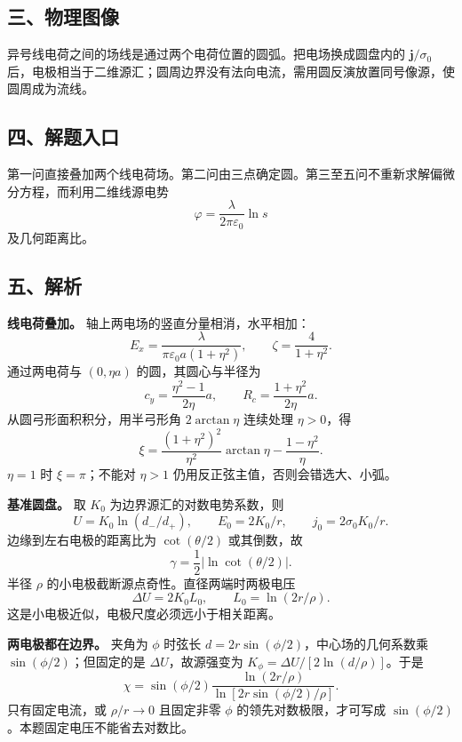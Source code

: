 \documentclass[12pt,a4paper,UTF8]{ctexart}
\begin{document}
\subsection{三、物理图像}\label{ux4e09ux7269ux7406ux56feux50cf-2}

异号线电荷之间的场线是通过两个电荷位置的圆弧。把电场换成圆盘内的
\(\boldsymbol j/\sigma_0\)
后，电极相当于二维源汇；圆周边界没有法向电流，需用圆反演放置同号像源，使圆周成为流线。

\subsection{四、解题入口}\label{ux56dbux89e3ux9898ux5165ux53e3-2}

第一问直接叠加两个线电荷场。第二问由三点确定圆。第三至五问不重新求解偏微分方程，而利用二维线源电势
\[
\varphi=\frac{\lambda}{2\pi\varepsilon_0}\ln s
\] 及几何距离比。

\subsection{五、解析}\label{ux4e94ux89e3ux6790-2}

\textbf{线电荷叠加。} 轴上两电场的竖直分量相消，水平相加： \[
E_x=\frac{\lambda}{\pi\varepsilon_0a(1+\eta^2)},
\qquad \boxed{\zeta=\frac4{1+\eta^2}}.
\] 通过两电荷与 \((0,\eta a)\) 的圆，其圆心与半径为 \[
c_y=\frac{\eta^2-1}{2\eta}a,\qquad
R_c=\frac{1+\eta^2}{2\eta}a.
\] 从圆弓形面积积分，用半弓形角 \(2\arctan\eta\) 连续处理 \(\eta>0\)，得
\[
\boxed{\xi=\frac{(1+\eta^2)^2}{\eta^2}\arctan\eta
-\frac{1-\eta^2}{\eta}}.
\] \(\eta=1\) 时 \(\xi=\pi\)；不能对 \(\eta>1\)
仍用反正弦主值，否则会错选大、小弧。

\textbf{基准圆盘。} 取 \(K_0\) 为边界源汇的对数电势系数，则 \[
U=K_0\ln(d_-/d_+),\qquad
E_0=2K_0/r,\qquad j_0=2\sigma_0K_0/r.
\] 边缘到左右电极的距离比为 \(\cot(\theta/2)\) 或其倒数，故 \[
\boxed{\gamma=\frac12|\ln\cot(\theta/2)|}.
\] 半径 \(\rho\) 的小电极截断源点奇性。直径两端时两极电压 \[
\Delta U=2K_0 L_0,\qquad L_0=\ln(2r/\rho).
\] 这是小电极近似，电极尺度必须远小于相关距离。

\textbf{两电极都在边界。} 夹角为 \(\phi\) 时弦长
\(d=2r\sin(\phi/2)\)，中心场的几何系数乘 \(\sin(\phi/2)\)；但固定的是
\(\Delta U\)，故源强变为 \(K_\phi=\Delta U/[2\ln(d/\rho)]\)。于是 \[
\boxed{\chi=\sin(\phi/2)
\frac{\ln(2r/\rho)}
{\ln[2r\sin(\phi/2)/\rho]}}.
\] 只有固定电流，或 \(\rho/r\to0\) 且固定非零 \(\phi\)
的领先对数极限，才可写成 \(\sin(\phi/2)\)。本题固定电压不能省去对数比。
\end{document}
